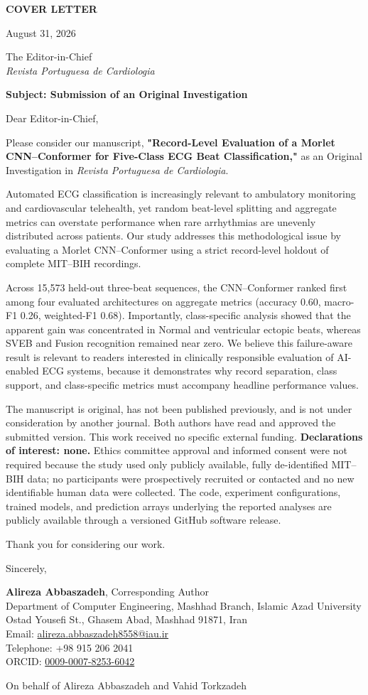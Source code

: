 \documentclass[11pt,a4paper]{article}
\begin{document}
\textbf{\large COVER LETTER}

August 31, 2026

The Editor-in-Chief\\
\textit{Revista Portuguesa de Cardiologia}

\textbf{Subject: Submission of an Original Investigation}

Dear Editor-in-Chief,

Please consider our manuscript, \textbf{"Record-Level Evaluation of a Morlet CNN--Conformer for Five-Class ECG Beat Classification,"} as an Original Investigation in \textit{Revista Portuguesa de Cardiologia}.

Automated ECG classification is increasingly relevant to ambulatory monitoring and cardiovascular telehealth, yet random beat-level splitting and aggregate metrics can overstate performance when rare arrhythmias are unevenly distributed across patients. Our study addresses this methodological issue by evaluating a Morlet CNN--Conformer using a strict record-level holdout of complete MIT--BIH recordings.

Across 15{,}573 held-out three-beat sequences, the CNN--Conformer ranked first among four evaluated architectures on aggregate metrics (accuracy 0.60, macro-F1 0.26, weighted-F1 0.68). Importantly, class-specific analysis showed that the apparent gain was concentrated in Normal and ventricular ectopic beats, whereas SVEB and Fusion recognition remained near zero. We believe this failure-aware result is relevant to readers interested in clinically responsible evaluation of AI-enabled ECG systems, because it demonstrates why record separation, class support, and class-specific metrics must accompany headline performance values.

The manuscript is original, has not been published previously, and is not under consideration by another journal. Both authors have read and approved the submitted version. This work received no specific external funding. \textbf{Declarations of interest: none.} Ethics committee approval and informed consent were not required because the study used only publicly available, fully de-identified MIT--BIH data; no participants were prospectively recruited or contacted and no new identifiable human data were collected. The code, experiment configurations, trained models, and prediction arrays underlying the reported analyses are publicly available through a versioned GitHub software release.

Thank you for considering our work.

Sincerely,

\textbf{Alireza Abbaszadeh}, Corresponding Author\\
Department of Computer Engineering, Mashhad Branch, Islamic Azad University\\
Ostad Yousefi St., Ghasem Abad, Mashhad 91871, Iran\\
Email: \href{mailto:alireza.abbaszadeh8558@iau.ir}{alireza.abbaszadeh8558@iau.ir}\\
Telephone: +98 915 206 2041\\
ORCID: \href{https://orcid.org/0009-0007-8253-6042}{0009-0007-8253-6042}

On behalf of Alireza Abbaszadeh and Vahid Torkzadeh
\end{document}
